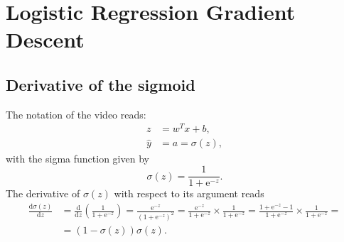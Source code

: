 \documentclass[a4paper,11pt]{article}
\newcommand{\of}[1]{\left( {#1} \right)}
\newcommand{\fracd}[2]{\frac{\dd{}{#1}}{\dd{}{#2}}}
\newcommand{\dd}{\text{d}}
\newcommand{\ee}{\text{e}}
\begin{document}
\section*{Logistic Regression Gradient Descent}
\subsection*{Derivative of the sigmoid}
The notation of the video reads:
\[
\begin{split}
z & = w^T x + b,\\
\hat y &= a = \sigma\of{z},
\end{split}
\]
with the sigma function given by
\[
\sigma\of{z} = \frac{1}{1 + \ee^{-z}}.
\]
The derivative of $\sigma\of{z}$ with respect to its argument reads
\[
\begin{split}
\fracd{\sigma\of{z}}{z} &= \fracd{}{z}\of{\frac{1}{1 + \ee^{-z}}}
                        = \frac{\ee^{-z}}{\of{1 + \ee^{-z}}^2}
                        = \frac{\ee^{-z}}{1 + \ee^{-z}} \times \frac{1}{1 + \ee^{-z}}
                        = \frac{1 + \ee^{-z} - 1}{1 + \ee^{-z}} \times \frac{1}{1 + \ee^{-z}} =\\
                        &= \of{1 - \sigma\of{z}} \sigma\of{z}.
\end{split}
\]
\end{document}
